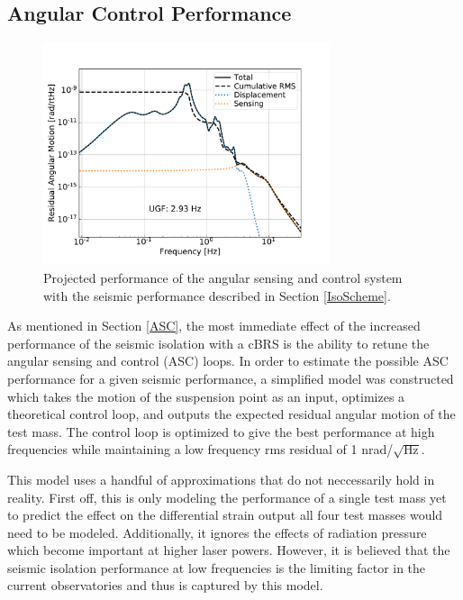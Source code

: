 \documentclass [12pt, proquest]{uwthesis}[2019]
\begin{document}
\subsection{Angular Control Performance}

\begin{figure}[!h]
\begin{center}
\includegraphics[width=0.75\textwidth]{cBRS_ASC_With.pdf}
\caption[Projected performance of the angular sensing and control system]{Projected performance of the angular sensing and control system with the seismic performance described in Section \ref{IsoScheme}.}
\label{ascWith}
\end{center}
\end{figure}

As mentioned in Section \ref{ASC}, the most immediate effect of the increased performance of the seismic isolation with a cBRS is the ability to retune the angular sensing and control (ASC) loops. In order to estimate the possible ASC performance for a given seismic performance, a simplified model was constructed which takes the motion of the suspension point as an input, optimizes a theoretical control loop, and outputs the expected residual angular motion of the test mass. The control loop is optimized to give the best performance at high frequencies while maintaining a low frequency rms residual of 1 nrad/$\sqrt{\text{Hz}}$.

This model uses a handful of approximations that do not neccessarily hold in reality. First off, this is only modeling the performance of a single test mass yet to predict the effect on the differential strain output all four test masses would need to be modeled. Additionally, it ignores the effects of radiation pressure which become important at higher laser powers. \cite{} However, it is believed that the seismic isolation performance at low frequencies is the limiting factor in the current observatories and thus is captured by this model. 
\end{document}
